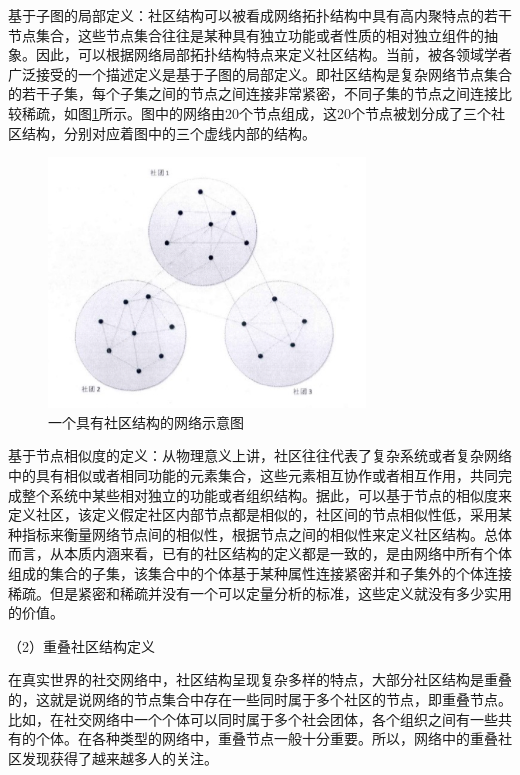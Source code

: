 基于子图的局部定义：社区结构可以被看成网络拓扑结构中具有高内聚特点的若干节点集合，这些节点集合往往是某种具有独立功能或者性质的相对独立组件的抽象。因此，可以根据网络局部拓扑结构特点来定义社区结构。当前，被各领域学者广泛接受的一个描述定义是基于子图的局部定义。即社区结构是复杂网络节点集合的若干子集，每个子集之间的节点之间连接非常紧密，不同子集的节点之间连接比较稀疏，如图\ref{fig:fig2-1}所示。图中的网络由20个节点组成，这20个节点被划分成了三个社区结构，分别对应着图中的三个虚线内部的结构。

\begin{figure}
  \centering
  \includegraphics[width=0.75\textwidth]{figures/fig2-1}
  \caption{一个具有社区结构的网络示意图}\label{fig:fig2-1}
\end{figure}

 基于节点相似度的定义：从物理意义上讲，社区往往代表了复杂系统或者复杂网络中的具有相似或者相同功能的元素集合，这些元素相互协作或者相互作用，共同完成整个系统中某些相对独立的功能或者组织结构。据此，可以基于节点的相似度来定义社区，该定义假定社区内部节点都是相似的，社区间的节点相似性低，采用某种指标来衡量网络节点间的相似性，根据节点之间的相似性来定义社区结构。总体而言，从本质内涵来看，已有的社区结构的定义都是一致的，是由网络中所有个体组成的集合的子集，该集合中的个体基于某种属性连接紧密并和子集外的个体连接稀疏。但是紧密和稀疏并没有一个可以定量分析的标准，这些定义就没有多少实用的价值。

 （2）重叠社区结构定义

	在真实世界的社交网络中，社区结构呈现复杂多样的特点，大部分社区结构是重叠的，这就是说网络的节点集合中存在一些同时属于多个社区的节点，即重叠节点。比如，在社交网络中一个个体可以同时属于多个社会团体，各个组织之间有一些共有的个体。在各种类型的网络中，重叠节点一般十分重要。所以，网络中的重叠社区发现获得了越来越多人的关注。
  
